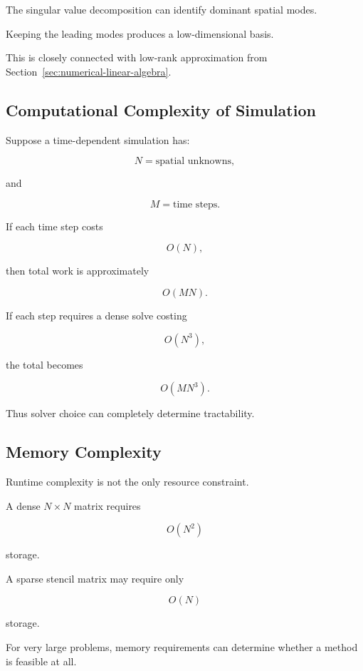 The singular value decomposition can identify dominant spatial modes.

Keeping the leading modes produces a low-dimensional basis.

This is closely connected with low-rank approximation from
Section~\ref{sec:numerical-linear-algebra}.

\subsection{Computational Complexity of Simulation}
\label{subsec:simulation-complexity}

Suppose a time-dependent simulation has:

\[
N
=
\text{spatial unknowns},
\]

and

\[
M
=
\text{time steps}.
\]

If each time step costs

\[
O(N),
\]

then total work is approximately

\[
\boxed{
O(MN).
}
\]

If each step requires a dense solve costing

\[
O(N^3),
\]

the total becomes

\[
\boxed{
O(MN^3).
}
\]

Thus solver choice can completely determine tractability.

\subsection{Memory Complexity}
\label{subsec:memory-complexity}

Runtime complexity is not the only resource constraint.

A dense \(N\times N\) matrix requires

\[
\boxed{
O(N^2)
}
\]

storage.

A sparse stencil matrix may require only

\[
\boxed{
O(N)
}
\]

storage.

For very large problems, memory requirements can determine whether a
method is feasible at all.

